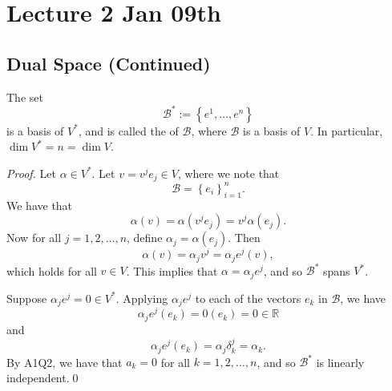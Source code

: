 \documentclass[notoc,notitlepage]{tufte-book}
\begin{document}


\chapter{Lecture 2 Jan 09th}%
\label{chp:lecture_2_jan_09th}

\section{Dual Space (Continued)}%
\label{sec:dual_space_continued}

\begin{propo}\label{propo:dual_basis}
  The set
  \begin{equation*}
    \mathcal{B}^* := \left\{ e^1, \ldots, e^n \right\}
  \end{equation*}
  is a basis of $V^*$, and is called the  of $\mathcal{B}$,
  where $\mathcal{B}$ is a basis of $V$.
  In particular, $\dim V^* = n = \dim V$.
\end{propo}

\begin{proof}
  Let $\alpha \in V^*$. Let $v = v^j e_j \in V$,
  where we note that
  \begin{equation*}
    \mathcal{B} = \left\{ e_i \right\}_{i = 1}^{n}.
  \end{equation*}
  We have that
  \begin{equation*}
    \alpha(v) = \alpha(v^j e_j) = v^j \alpha( e_j ).
  \end{equation*}
  Now for all $j = 1, 2, \ldots, n$, define $\alpha_j = \alpha(e_j)$.
  Then
  \begin{equation*}
    \alpha(v) = \alpha_j v^j = \alpha_j e^j(v),
  \end{equation*}
  which holds for all $v \in V$. This implies that $\alpha = \alpha_j e^j$,
  and so $\mathcal{B}^*$ spans $V^*$.

  \noindent
  Suppose $\alpha_j e^j = 0 \in V^*$.
  Applying $\alpha_j e^j$ to each of the vectors $e_k$ in $\mathcal{B}$, we have
  \begin{equation*}
    \alpha_j e^j(e_k) = 0(e_k) = 0 \in \mathbb{R}
  \end{equation*}
  and
  \begin{equation*}
    \alpha_j e^j(e_k) = \alpha_j \delta_k^j = \alpha_k.
  \end{equation*}
  By A1Q2, we have that $a_k = 0$ for all $k = 1, 2, \ldots, n$,
  and so $\mathcal{B}^*$ is linearly independent.\qed\
\end{proof}
\end{document}
